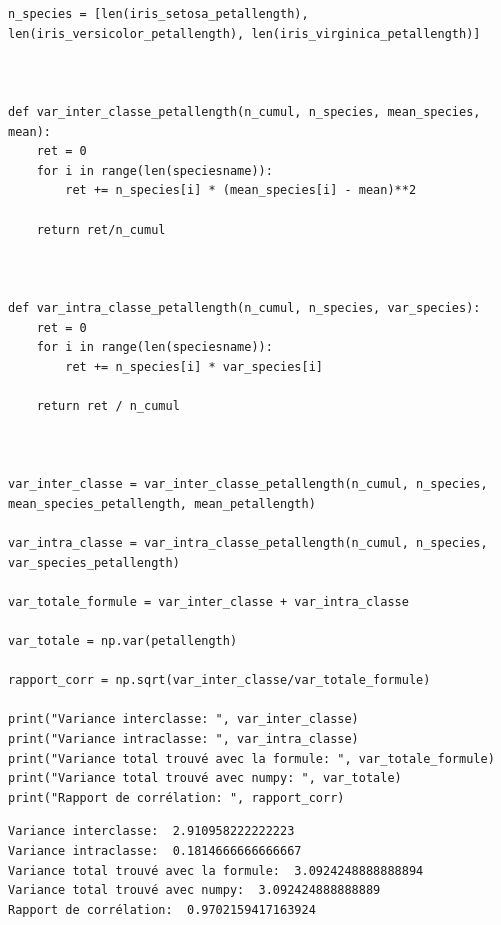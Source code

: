 \begin{enumerate}
\begin{lstlisting}[style=myPython, caption=Code Python pour calculer le coefficient de corrélation, frame=lines]
n_species = [len(iris_setosa_petallength), len(iris_versicolor_petallength), len(iris_virginica_petallength)]



def var_inter_classe_petallength(n_cumul, n_species, mean_species, mean):
    ret = 0
    for i in range(len(speciesname)):
        ret += n_species[i] * (mean_species[i] - mean)**2

    return ret/n_cumul



def var_intra_classe_petallength(n_cumul, n_species, var_species):
    ret = 0
    for i in range(len(speciesname)):
        ret += n_species[i] * var_species[i]

    return ret / n_cumul



var_inter_classe = var_inter_classe_petallength(n_cumul, n_species, mean_species_petallength, mean_petallength)

var_intra_classe = var_intra_classe_petallength(n_cumul, n_species, var_species_petallength)

var_totale_formule = var_inter_classe + var_intra_classe

var_totale = np.var(petallength)

rapport_corr = np.sqrt(var_inter_classe/var_totale_formule)

print("Variance interclasse: ", var_inter_classe)
print("Variance intraclasse: ", var_intra_classe)
print("Variance total trouvé avec la formule: ", var_totale_formule)
print("Variance total trouvé avec numpy: ", var_totale)
print("Rapport de corrélation: ", rapport_corr)
            \end{lstlisting}
            
            \begin{lstlisting}[style=myLog, caption=Résultat du code, frame=lines]
Variance interclasse:  2.910958222222223
Variance intraclasse:  0.1814666666666667
Variance total trouvé avec la formule:  3.0924248888888894
Variance total trouvé avec numpy:  3.092424888888889
Rapport de corrélation:  0.9702159417163924                
            \end{lstlisting}


\end{enumerate}




\clearpage